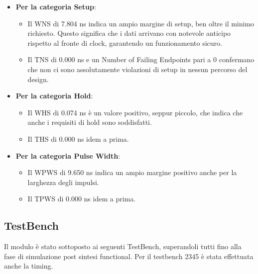 \documentclass{article}
\begin{document}
\begin{itemize}
\item \textbf{Per la categoria Setup}:
\begin{itemize}
\item Il WNS di 7.804 ns indica un ampio margine di setup, ben oltre il minimo richiesto. Questo significa che i dati arrivano con notevole anticipo rispetto al fronte di clock, garantendo un funzionamento sicuro.
\item Il TNS di 0.000 ns e un Number of Failing Endpoints pari a 0 confermano che non ci sono assolutamente violazioni di setup in nessun percorso del design.
\end{itemize}
\item \textbf{Per la categoria Hold}:
\begin{itemize}
\item Il WHS di 0.074 ns è un valore positivo, seppur piccolo, che indica che anche i requisiti di hold sono soddisfatti.
\item Il THS di 0.000 ns idem a prima.
\end{itemize}
\item \textbf{Per la categoria Pulse Width}:
\begin{itemize}
\item Il WPWS di 9.650 ns indica un ampio margine positivo anche per la larghezza degli impulsi.
\item Il TPWS di 0.000 ns idem a prima.
\end{itemize}
\end{itemize}

\subsection{TestBench}

Il modulo è stato sottoposto ai seguenti TestBench, superandoli tutti fino alla fase di simulazione post sintesi functional.
Per il testbench 2345 è stata effettuata anche la timing.
\end{document}
